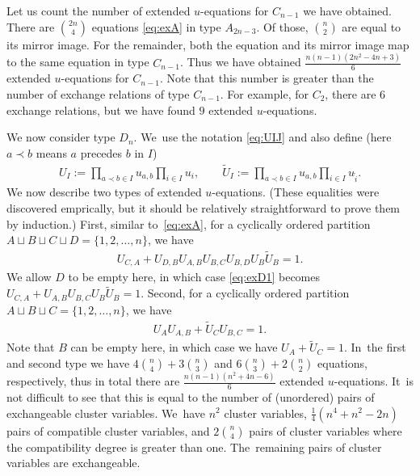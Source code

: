 \documentclass[pdftex]{sigma}%
\numberwithin{equation}{section}
\begin{document}
Let us count the number of extended $u$-equations for $C_{n-1}$ we have obtained. There are $\binom{2n}{4}$ equations \eqref{eq:exA} in type $A_{2n-3}$. Of those, $\binom{n}{2}$ are equal to its mirror image. For the remainder, both the equation and its mirror image map to the same equation in type $C_{n-1}$. Thus we have obtained $\frac{n(n{-}1)(2n^2-4n+3)}{6}$ extended $u$-equations for $C_{n-1}$. Note that this number is greater than the number of exchange relations of type $C_{n-1}$. For example, for $C_2$, there are $6$ exchange relations, but we have found $9$ extended $u$-equations.

\medskip{} %
We now consider type $D_n$. We~use the notation \eqref{eq:UIJ} and also define (here $a\prec b$ means $a$ precedes $b$ in $I$)
\begin{gather*}
U_I:=\prod_{a\prec b \in I} u_{a,b} \prod_{i \in I} u_i,\qquad
\tilde{U}_I:=\prod_{a\prec b \in I} u_{a,b} \prod_{i \in I} u_{\tilde i}.
\end{gather*}
We now describe two types of extended $u$-equations. (These equalities were discovered emprically, but it should be relatively straightforward to prove them by induction.) First, similar to~\eqref{eq:exA}, for a cyclically ordered partition $A\sqcup B\sqcup C\sqcup D=\{1,2,\dots, n\}$, we have
\begin{gather}\label{eq:exD1}
U_{C,A}+U_{D,B} U_{A,B} U_{B,C} U_{B,D} U_B \tilde{U}_B=1.
\end{gather}
We allow $D$ to be empty here, in which case \eqref{eq:exD1} becomes $U_{C,A}+U_{A,B} U_{B,C} U_B \tilde{U}_B=1$. Second, for a cyclically ordered partition $A\sqcup B\sqcup C=\{1,2,\dots, n\}$, we have
\begin{gather}\label{eq:exD2}
U_A U_{A,B}+\tilde{U}_C U_{B,C}=1.
\end{gather}
Note that $B$ can be empty here, in which case we have $U_A+\tilde{U}_C=1$. In~the first and second type we have $4 {n \choose 4}+3 {n \choose 3}$ and $6 {n \choose 3}+2 {n \choose 2}$ equations, respectively, thus in total there are $\frac{n(n{-}1)(n^2+4n-6)}6$ extended $u$-equations. It~is not difficult to see that this is equal to the number of (unordered) pairs of exchangeable cluster variables. We~have $n^2$ cluster variables, $\frac{1}{4}(n^4+n^2-2n)$ pairs of compatible cluster variables, and $2\binom{n}{4}$ pairs of cluster variables where the compatibility degree is greater than one. The~remaining pairs of cluster variables are exchangeable.
\end{document}
